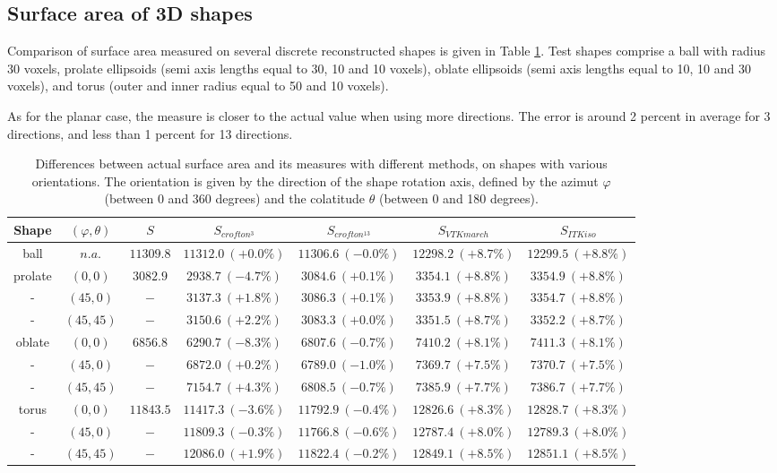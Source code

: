 \documentclass{InsightArticle}
\begin{document}
\subsection{Surface area of 3D shapes}

Comparison of surface area measured on several discrete reconstructed shapes is given in
Table \ref{tab:CompareSurfaceArea}.
Test shapes comprise a ball with radius 30 voxels, 
prolate ellipsoids (semi axis lengths equal to 30, 10 and 10 voxels), 
oblate ellipsoids (semi axis lengths equal to 10, 10 and 30 voxels), 
and torus (outer and inner radius equal to 50 and 10 voxels).

As for the planar case, the measure is closer to the actual value when using more
directions. The error is around 2 percent in average for 3 directions, and less than
1 percent for 13 directions.

\begin{table}[!htb]
\begin{center}\begin{tabular}{ccccccc}
Shape      & $(\varphi,\theta)$ & $S$            & $S_{crofton^3}$     & $S_{crofton^{13}}$  & $S_{VTKmarch}$       & $S_{ITKiso}$  \tabularnewline
\hline 
\hline 
ball       & $n.a.$             &     $11309.8$  & $11312.0\ (+0.0\%)$ & $11306.6\ (-0.0\%)$ & $12298.2\ (+8.7\%)$  & $12299.5\ (+8.8\%)$ \tabularnewline 
prolate    & $( 0,  0)$         &     $3082.9$   & $2938.7\ (-4.7\%)$  & $3084.6\ (+0.1\%)$  & $3354.1\ (+8.8\%)$   & $3354.9\ (+8.8\%)$  \tabularnewline
-          & $(45,  0)$         &     $-$        & $3137.3\ (+1.8\%)$  & $3086.3\ (+0.1\%)$  & $3353.9\ (+8.8\%)$   & $3354.7\ (+8.8\%)$  \tabularnewline
-          & $(45, 45)$         &     $-$        & $3150.6\ (+2.2\%)$  & $3083.3\ (+0.0\%)$  & $3351.5\ (+8.7\%)$   & $3352.2\ (+8.7\%)$  \tabularnewline
oblate     & $( 0,  0)$         &     $6856.8$   & $6290.7\ (-8.3\%)$  & $6807.6\ (-0.7\%)$  & $7410.2\ (+8.1\%)$   & $7411.3\ (+8.1\%)$  \tabularnewline
-          & $(45,  0)$         &     $-$        & $6872.0\ (+0.2\%)$  & $6789.0\ (-1.0\%)$  & $7369.7\ (+7.5\%)$   & $7370.7\ (+7.5\%)$  \tabularnewline
-          & $(45, 45)$         &     $-$        & $7154.7\ (+4.3\%)$  & $6808.5\ (-0.7\%)$  & $7385.9\ (+7.7\%)$   & $7386.7\ (+7.7\%)$  \tabularnewline
torus      & $( 0,  0)$         &     $11843.5$  & $11417.3\ (-3.6\%)$ & $11792.9\ (-0.4\%)$ & $12826.6\ (+8.3\%)$  & $12828.7\ (+8.3\%)$ \tabularnewline
-          & $(45,  0)$         &     $-$        & $11809.3\ (-0.3\%)$ & $11766.8\ (-0.6\%)$ & $12787.4\ (+8.0\%)$  & $12789.3\ (+8.0\%)$ \tabularnewline
-          & $(45, 45)$         &     $-$        & $12086.0\ (+1.9\%)$ & $11822.4\ (-0.2\%)$ & $12849.1\ (+8.5\%)$  & $12851.1\ (+8.5\%)$ \tabularnewline
\hline 
\end{tabular}\end{center}
\caption{ \label{tab:CompareSurfaceArea}
Differences between actual surface area and its measures with different methods, 
on shapes with various orientations.
The orientation is given by the direction of the shape rotation axis, defined by 
the azimut $\varphi$ (between 0 and 360 degrees) and the colatitude $\theta$ (between 0 and 180 degrees).}
\end{table}
\end{document}
